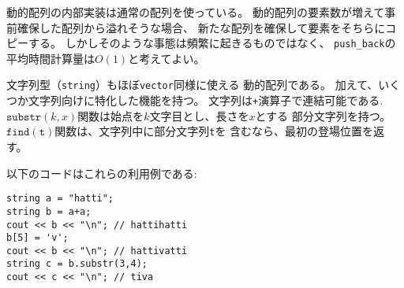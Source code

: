 動的配列の内部実装は通常の配列を使っている。
動的配列の要素数が増えて事前確保した配列から溢れそうな場合、
新たな配列を確保して要素をそちらにコピーする。
しかしそのような事態は頻繁に起きるものではなく、
\texttt{push\_back}の平均時間計算量は$O(1)$と考えてよい。

\begin{comment}
\index{string}

The \texttt{string} structure
is also a dynamic array that can be used almost like a vector.
In addition, there is special syntax for strings
that is not available in other data structures.
Strings can be combined using the \texttt{+} symbol.
The function $\texttt{substr}(k,x)$ returns the substring
that begins at position $k$ and has length $x$,
and the function $\texttt{find}(\texttt{t})$ finds the position
of the first occurrence of a substring \texttt{t}.

The following code presents some string operations:
\end{comment}


文字列型（\texttt{string}）もほぼ\texttt{vector}同様に使える
動的配列である。
加えて、いくつか文字列向けに特化した機能を持つ。
文字列は\texttt{+}演算子で連結可能である.
$\texttt{substr}(k,x)$関数は始点を$k$文字目とし、長さを$x$とする
部分文字列を持つ。
$\texttt{find}(\texttt{t})$関数は、文字列中に部分文字列\texttt{t}を
含むなら、最初の登場位置を返す。

以下のコードはこれらの利用例である:

\begin{lstlisting}
string a = "hatti";
string b = a+a;
cout << b << "\n"; // hattihatti
b[5] = 'v';
cout << b << "\n"; // hattivatti
string c = b.substr(3,4);
cout << c << "\n"; // tiva
\end{lstlisting}

\begin{comment}
\section{Set structures}

\index{set}

A \key{set} is a data structure that
maintains a collection of elements.
The basic operations of sets are element
insertion, search and removal.

The C++ standard library contains two set
implementations:
The structure \texttt{set} is based on a balanced
binary tree and its operations work in $O(\log n)$ time.
The structure \texttt{unordered\_set} uses hashing,
and its operations work in $O(1)$ time on average.
\end{comment}

